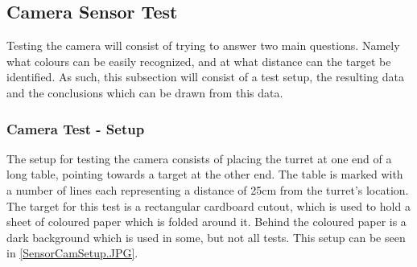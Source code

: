 % 
% 

\subsection{Camera Sensor Test}\label{CamTest}%
Testing the camera will consist of trying to answer two main questions. Namely
what colours can be easily recognized, and at what distance can the target be
identified. As such, this subsection will consist of a test setup, the resulting
data and the conclusions which can be drawn from this data.

\subsubsection{Camera Test - Setup}\label{CamTestSetup}
The setup for testing the camera consists of placing the turret at one end of a
long table, pointing towards a target at the other end. The table is marked with
a number of lines each representing a distance of 25cm from the turret's
location. The target for this test is a rectangular cardboard cutout, which is
used to hold a sheet of coloured paper which is folded around it. Behind the
coloured paper is a dark background which is used in some, but not all tests.
This setup can be seen in \autoref{SensorCamSetup.JPG}.


